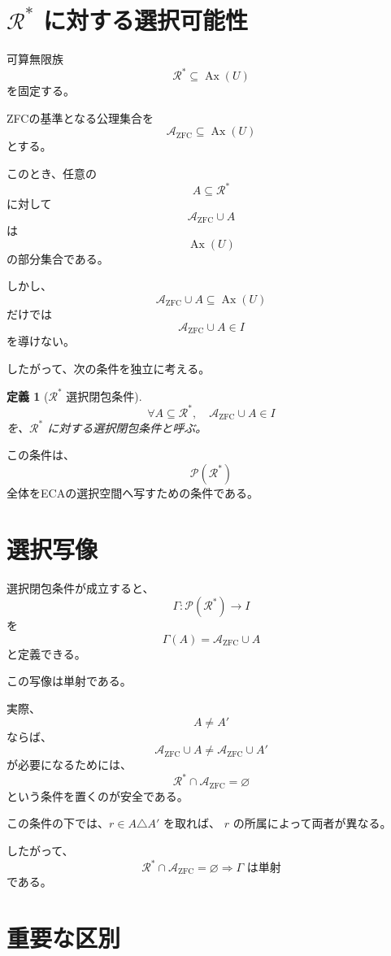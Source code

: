 \documentclass[11pt,a4paper]{article}
\newtheorem{definition}{定義}
\begin{document}
\section{$\mathcal R^*$ に対する選択可能性}

可算無限族
\[
\mathcal R^*\subseteq\operatorname{Ax}(U)
\]
を固定する。

ZFCの基準となる公理集合を
\[
\mathcal A_{\mathrm{ZFC}}\subseteq\operatorname{Ax}(U)
\]
とする。

このとき、任意の
\[
A\subseteq\mathcal R^*
\]
に対して
\[
\mathcal A_{\mathrm{ZFC}}\cup A
\]
は
\[
\operatorname{Ax}(U)
\]
の部分集合である。

しかし、
\[
\mathcal A_{\mathrm{ZFC}}\cup A
\subseteq\operatorname{Ax}(U)
\]
だけでは
\[
\mathcal A_{\mathrm{ZFC}}\cup A\in I
\]
を導けない。

したがって、次の条件を独立に考える。

\begin{definition}[$\mathcal R^*$ 選択閉包条件]
\[
\boxed{
\forall A\subseteq\mathcal R^*,
\quad
\mathcal A_{\mathrm{ZFC}}\cup A\in I
}
\]
を、$\mathcal R^*$ に対する選択閉包条件と呼ぶ。
\end{definition}

この条件は、
\[
\mathcal P(\mathcal R^*)
\]
全体をECAの選択空間へ写すための条件である。

\section{選択写像}

選択閉包条件が成立すると、
\[
\Gamma:
\mathcal P(\mathcal R^*)
\longrightarrow I
\]
を
\[
\boxed{
\Gamma(A)=\mathcal A_{\mathrm{ZFC}}\cup A
}
\]
と定義できる。

この写像は単射である。

実際、
\[
A\neq A'
\]
ならば、
\[
\mathcal A_{\mathrm{ZFC}}\cup A
\neq
\mathcal A_{\mathrm{ZFC}}\cup A'
\]
が必要になるためには、
\[
\mathcal R^*\cap\mathcal A_{\mathrm{ZFC}}=\varnothing
\]
という条件を置くのが安全である。

この条件の下では、$r\in A\triangle A'$ を取れば、
$r$ の所属によって両者が異なる。

したがって、
\[
\boxed{
\mathcal R^*\cap\mathcal A_{\mathrm{ZFC}}=\varnothing
\Longrightarrow
\Gamma\text{ は単射}
}
\]
である。

\section{重要な区別}
\end{document}
